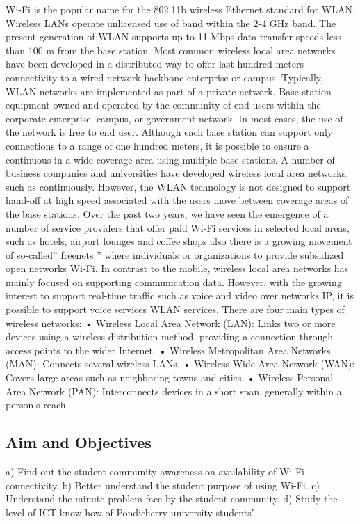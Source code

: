 ﻿\documentclass[10]{article}
\begin{document}
Wi-Fi is the popular name for the 802.11b wireless Ethernet standard for WLAN. Wireless LANs operate unlicensed use of band within the 2-4 GHz band. The present generation of WLAN supports up to 11 Mbps data transfer speeds less than 100 m from the base station. Most common wireless local area networks have been developed in a distributed way to offer last hundred meters connectivity to a wired network backbone enterprise or campus. Typically, WLAN networks are implemented as part of a private network. Base station equipment owned and operated by the community of end-users within the corporate enterprise, campus, or government network. In most cases, the use of the network is free to end user.
Although each base station can support only connections to a range of one hundred meters, it is possible to ensure a continuous in a wide coverage area using multiple base stations. A number of business companies and universities have developed wireless local area networks, such as continuously. However, the WLAN technology is not designed to support hand-off at high speed associated with the users move between coverage areas of the base stations.
Over the past two years, we have seen the emergence of a number of service providers that offer paid Wi-Fi services in selected local areas, such as hotels, airport lounges and coffee shops also there is a growing movement of so-called'' freenets '' where individuals or organizations to provide subsidized open networks Wi-Fi.
In contrast to the mobile, wireless local area networks has mainly focused on supporting communication data. However, with the growing interest to support real-time traffic such as voice and video over networks IP, it is possible to support voice services WLAN services.
There are four main types of wireless networks:
•	Wireless Local Area Network (LAN): Links two or more devices using a wireless distribution method, providing a connection through access points to the wider Internet.
•	Wireless Metropolitan Area Networks (MAN): Connects several wireless LANs.
•	Wireless Wide Area Network (WAN): Covers large areas such as neighboring towns and cities.
•	Wireless Personal Area Network (PAN): Interconnects devices in a short span, generally within a person’s reach.

\subsection{Aim and Objectives}

a)	Find out the student community awareness on availability of Wi-Fi connectivity.
b)	Better understand the student purpose of using Wi-Fi.
c)	Understand the minute problem face by the student community.
d)	Study the level of ICT know how of Pondicherry university students’.
\end{document}
